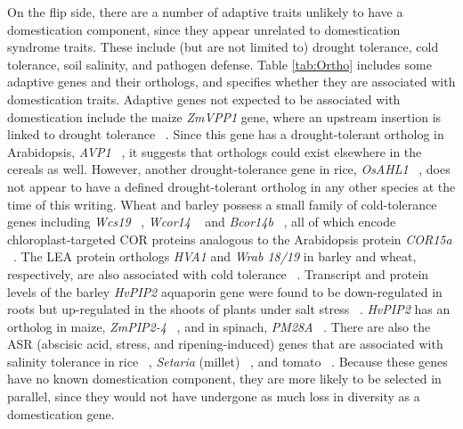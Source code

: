 \documentclass[12pt]{article}
\newcommand{\mbh}[1]{\textcolor{red}{\normalsize  #1}}
\begin{document}
On the flip side, there are a number of adaptive traits unlikely to have a domestication component, since they appear unrelated to domestication syndrome traits.
These include (but are not limited to) drought tolerance, cold tolerance, soil salinity, and pathogen defense.
Table \ref{tab:Ortho} includes some adaptive genes and their orthologs, and specifies whether they are associated with domestication traits.
Adaptive genes not expected to be associated with domestication include the maize \textit{ZmVPP1} gene, where an upstream insertion is linked to drought tolerance ~\citep{Wang2016}.
Since this gene has a drought-tolerant ortholog in Arabidopsis, \textit{AVP1} ~\citep{Gaxiola2001}, it suggests that orthologs could exist elsewhere in the cereals as well.
However, another drought-tolerance gene in rice, \textit{OsAHL1} ~\citep{Zhou2016}, does not appear to have a defined drought-tolerant ortholog in any other species at the time of this writing.
Wheat and barley possess a small family of cold-tolerance genes including \textit{Wcs19} ~\citep{pmid8219063}, \textit{Wcor14} ~\citep{pmid10846621} and \textit{Bcor14b} ~\citep{pmid9952464}, all of which encode chloroplast-targeted COR proteins analogous to the Arabidopsis protein \textit{COR15a}  ~\citep{pmid9826741, Takumi2003}.
The LEA protein orthologs \textit{HVA1} and \textit{Wrab 18/19} in barley and wheat, respectively, are also associated with cold tolerance ~\citep{Hong1988, pmid16755132}.
Transcript and protein levels of the barley \textit{HvPIP2} aquaporin gene were found to be down-regulated in roots but up-regulated in the shoots of plants under salt stress ~\citep{Katsuhara2002}.
\textit{HvPIP2} has an ortholog in maize, \textit{ZmPIP2-4} ~\citep{Zhu2005}, and in spinach, \textit{PM28A} ~\citep{Fotiadis2000}.
There are also the ASR (abscisic acid, stress, and ripening-induced) genes that are associated with salinity tolerance in rice ~\citep{Joo2013}, \textit{Setaria} (millet) ~\citep{Li2017}, and tomato ~\citep{Konrad2008}.  
Because these genes have no known domestication component, they are more likely to be selected in parallel, since they would not have undergone as much loss in diversity as a domestication gene. 

\end{document}
